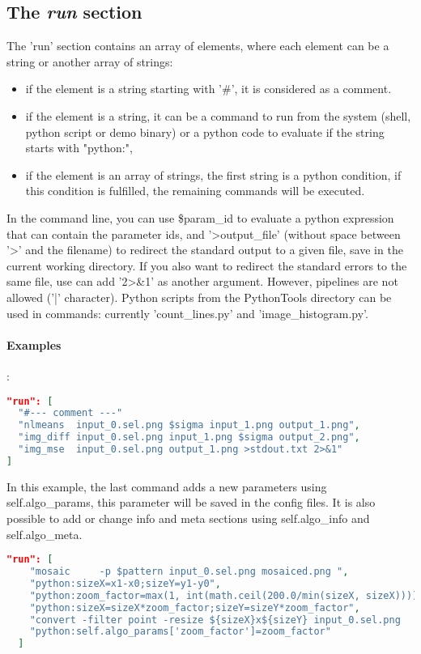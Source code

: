 \subsection{The \emph{run} section}

The 'run' section contains an array of elements, where each element can be 
a string or another array of strings:
\begin{itemize}
\item if the element is a string starting with '\#', it is considered as a comment.
\item if the element is a string, it can be a command to run from the system (shell, 
python script or demo binary) or a python code to evaluate if the string
starts with "python:",
\item if the element is an array of strings, the first string is a python
condition, if this condition is fulfilled, the remaining commands will be
executed.
\end{itemize}
In the command line, you can use \$param\_id to evaluate a 
python expression that can contain the parameter ids,
and '\textgreater output\_file' (without space between '\textgreater' and the 
filename) to redirect the standard output to a given file, save in the current 
working directory. 
If you also want to redirect the standard errors to the same file, use can add 
'2\textgreater\&1' as another argument. However, pipelines are not allowed 
('|' character).
Python scripts from the PythonTools directory can be used in commands: currently
'count\_lines.py' and 'image\_histogram.py'.


\paragraph{Examples}:\\
\begin{lstlisting}[language=json,firstnumber=1]
"run": [
  "#--- comment ---"
  "nlmeans  input_0.sel.png $sigma input_1.png output_1.png",
  "img_diff input_0.sel.png input_1.png $sigma output_2.png",
  "img_mse  input_0.sel.png output_1.png >stdout.txt 2>&1"
]
\end{lstlisting}

In this example, the last command adds a new parameters using self.algo\_params,
this parameter will be saved in the config files. It is also possible to add 
or change info and meta sections using self.algo\_info and self.algo\_meta.
\begin{lstlisting}[language=json,firstnumber=1]
  "run": [ 
    "mosaic     -p $pattern input_0.sel.png mosaiced.png ",
    "python:sizeX=x1-x0;sizeY=y1-y0",
    "python:zoom_factor=max(1, int(math.ceil(200.0/min(sizeX, sizeX))))",
    "python:sizeX=sizeX*zoom_factor;sizeY=sizeY*zoom_factor",
    "convert -filter point -resize ${sizeX}x${sizeY} input_0.sel.png    input_0.sel_zoom.png",
    "python:self.algo_params['zoom_factor']=zoom_factor"
  ]
\end{lstlisting}


